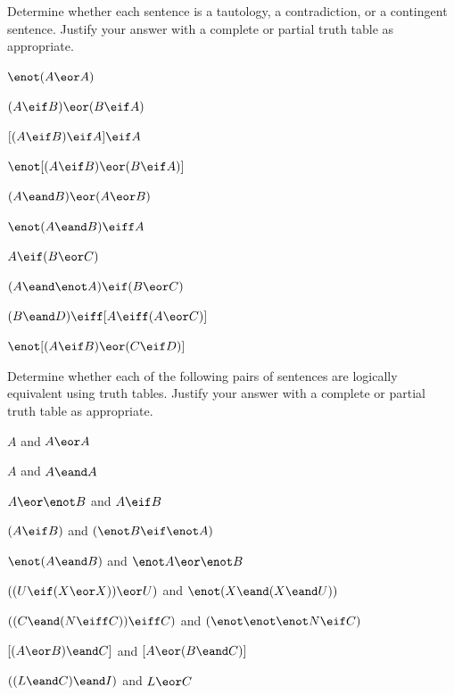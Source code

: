 \noindent\problempart
\label{pr.TT.TTorC4}
Determine whether each sentence is a tautology, a contradiction, or a contingent sentence. Justify your answer with a complete or partial truth table as appropriate.
\begin{compactlist}
\item  $\enot (A \eor A)$\vspace{.5ex}							%
\item $(A \eif B) \eor (B \eif A)$\vspace{.5ex}					%
\item $[(A \eif B) \eif A] \eif A$\vspace{.5ex}					%
\item $\enot[( A \eif B) \eor (B \eif A)]$\vspace{.5ex}			%
\item $(A \eand B) \eor (A \eor B)$\vspace{.5ex} 				%
\item $\enot(A\eand B) \eiff A$\vspace{.5ex} 					%
\item $A\eif(B\eor C)$\vspace{.5ex} 							%
\item $(A \eand\enot A) \eif (B \eor C)$\vspace{.5ex} 			%
\item $(B\eand D) \eiff [A \eiff(A \eor C)]$\vspace{.5ex}			%
\item $\enot[(A \eif B) \eor (C \eif D)]$\vspace{.5ex} 			%
\end{compactlist}



\noindent\problempart
Determine whether each of the following pairs of sentences are logically equivalent using truth tables. Justify your answer with a complete or partial truth table as appropriate.
\begin{compactlist}
\item $A$ and $A \eor A$
\item $A$ and $A \eand A$
\item $A \eor \enot B$ and $A\eif B$
\item $(A \eif B)$ and $(\enot B \eif \enot A)$
\item $\enot(A \eand B)$ and $\enot A \eor \enot B$
\item $ ((U \eif (X \eor X)) \eor U)$ and $\enot (X \eand (X \eand U))$
\item $ ((C \eand (N \eiff C)) \eiff C)$ and $(\enot \enot \enot N \eif C)$
\item $[(A \eor B) \eand C]$ and $[A \eor (B \eand C)]$
\item $((L \eand C) \eand I)$ and $L \eor C$
\end{compactlist}


